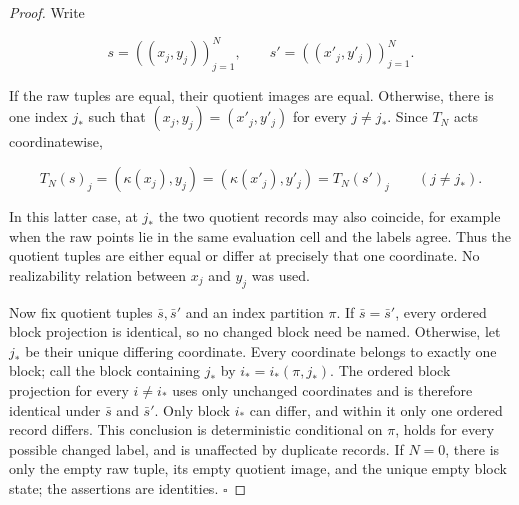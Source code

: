 \begin{proof}
Write

\[
 s=((x_j,y_j))_{j=1}^N,
 \qquad
 s'=((x'_j,y'_j))_{j=1}^N.
\]

If the raw tuples are equal, their quotient images are equal. Otherwise,
there is one index \(j_*\) such that
\((x_j,y_j)=(x'_j,y'_j)\) for every \(j\ne j_*\). Since \(T_N\) acts
coordinatewise,

\[
 T_N(s)_j=(\kappa(x_j),y_j)
          =(\kappa(x'_j),y'_j)=T_N(s')_j
 \qquad(j\ne j_*).
\tag{12}
\]

In this latter case, at \(j_*\) the two quotient records may also coincide,
for example when
the raw points lie in the same evaluation cell and the labels agree. Thus
the quotient tuples are either equal or differ at precisely that one
coordinate. No realizability relation between \(x_j\) and \(y_j\) was used.

Now fix quotient tuples \(\bar s,\bar s'\) and an index partition \(\pi\). If
\(\bar s=\bar s'\), every ordered block projection is identical, so no
changed block need be named. Otherwise, let \(j_*\) be their unique differing
coordinate. Every coordinate belongs to exactly one block; call the block
containing \(j_*\) by \(i_*=i_*(\pi,j_*)\). The
ordered block projection for every \(i\ne i_*\) uses only unchanged
coordinates and is therefore identical under \(\bar s\) and \(\bar s'\).
Only block \(i_*\) can differ, and within it only one ordered record differs.
This conclusion is deterministic conditional on \(\pi\), holds for every
possible changed label, and is unaffected by duplicate records. If \(N=0\),
there is only the empty raw tuple, its empty quotient image, and the unique
empty block state; the assertions are identities. \(\square\)


\end{proof}

